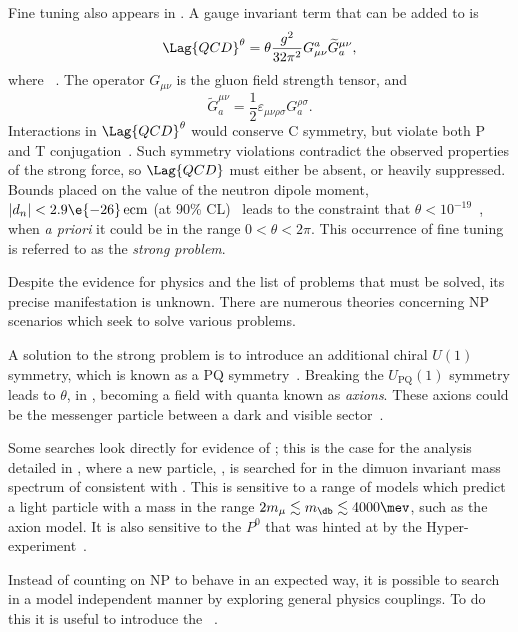 Fine tuning also appears in \QCD.
A gauge invariant term that can be added to  is
\begin{equation}
  \Lag{QCD}^\theta = \theta\frac{g^2}{32\pi^2}
  G_{\mu\nu}^a\widetilde G^{\mu\nu}_a,
  \label{eq:strongcp}
\end{equation}
where ~\cite{Peccei:2006as}.
The operator $G_{\mu\nu}$ is the gluon field strength tensor, and
\begin{equation}
  \widetilde G^{\mu\nu}_a = \frac12\varepsilon_{\mu\nu\rho\sigma}G^{\rho\sigma}_a.
\end{equation}
Interactions in $\Lag{QCD}^\theta$ would conserve \gls{C} symmetry, but violate both \gls{P} and
\gls{T} conjugation~\cite{Peccei:2006as}.
Such symmetry violations contradict the observed properties of the strong
force, so $\Lag{QCD}$ must either be absent, or heavily suppressed.
Bounds placed on the value of the neutron dipole moment, $|d_n| <2.9\e{-26}\,\mathrm{ecm}$
(at 90\% CL)~\cite{Baker:2006ts} leads to the constraint that
$\theta<10^{-19}$~\cite{Crewther:PQref9}, when \emph{a priori} it could be in the range
$0<\theta<2\pi$.
This occurrence of fine tuning is referred to as the \emph{strong \CP problem}.

Despite the evidence for \bsm physics and the list of problems that must be solved, its precise
manifestation is unknown.
There are numerous theories concerning NP scenarios which seek to solve various problems.

A solution to the strong \CP problem is to introduce an additional chiral $U(1)$ symmetry,
which is known as a \gls{PQ} symmetry~\cite{Peccei:2006as}.
Breaking the $U_\mathrm{PQ}(1)$ symmetry leads to $\theta$, in , becoming a
field with quanta known as \emph{axions}.
These axions could be the messenger particle between a dark and visible
sector~\cite{Peccei:2006as}.




Some searches look directly for evidence of \np; this is the case for the analysis detailed in
, where a new particle, \db, is searched for in the dimuon invariant mass spectrum of
\decay{\Bd}{\Kstarent\mumu} consistent with \decay{\db}{\mumu}.
This is sensitive to a range of models which predict a light particle with a mass in the range
$2m_\mu\lesssim m_\db\lesssim4000\mev$, such as the axion model.
It is also sensitive to the $P^0$ that was hinted at by the Hyper-\CP
experiment~\cite{Park:2005eka}.

Instead of counting on NP to behave in an expected way, it is possible to search in a model
independent manner by exploring general physics couplings.
To do this it is useful to introduce the \OPE~\cite{PhysRev.179.1499}.


